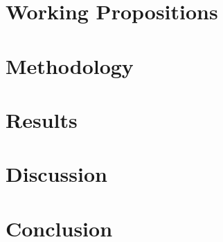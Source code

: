 \chapter{Working Propositions}

\chapter{Methodology}

\chapter{Results}

\chapter{Discussion}

\chapter{Conclusion}